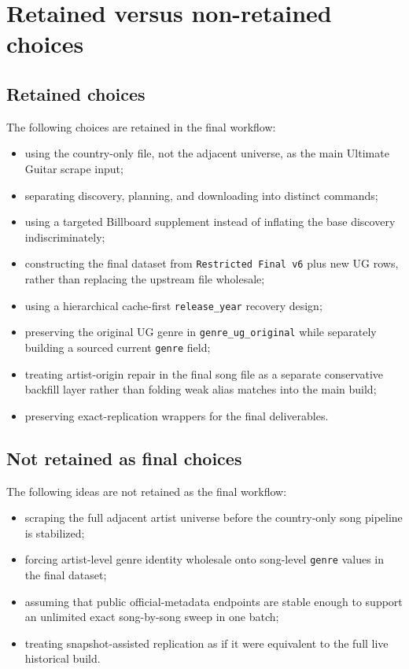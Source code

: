 \documentclass[11pt]{article}
\begin{document}
\section{Retained versus non-retained choices}
\subsection{Retained choices}
The following choices are retained in the final workflow:
\begin{itemize}[leftmargin=2em]
\item using the country-only file, not the adjacent universe, as the main
Ultimate Guitar scrape input;
\item separating discovery, planning, and downloading into distinct commands;
\item using a targeted Billboard supplement instead of inflating the base
discovery indiscriminately;
\item constructing the final dataset from \texttt{Restricted Final v6} plus new
UG rows, rather than replacing the upstream file wholesale;
\item using a hierarchical cache-first \texttt{release\_year} recovery design;
\item preserving the original UG genre in \texttt{genre\_ug\_original} while
separately building a sourced current \texttt{genre} field;
\item treating artist-origin repair in the final song file as a separate
conservative backfill layer rather than folding weak alias matches into the
main build;
\item preserving exact-replication wrappers for the final deliverables.
\end{itemize}

\subsection{Not retained as final choices}
The following ideas are not retained as the final workflow:
\begin{itemize}[leftmargin=2em]
\item scraping the full adjacent artist universe before the country-only song
pipeline is stabilized;
\item forcing artist-level genre identity wholesale onto song-level
\texttt{genre} values in the final dataset;
\item assuming that public official-metadata endpoints are stable enough to
support an unlimited exact song-by-song sweep in one batch;
\item treating snapshot-assisted replication as if it were equivalent to the
full live historical build.
\end{itemize}
\end{document}
